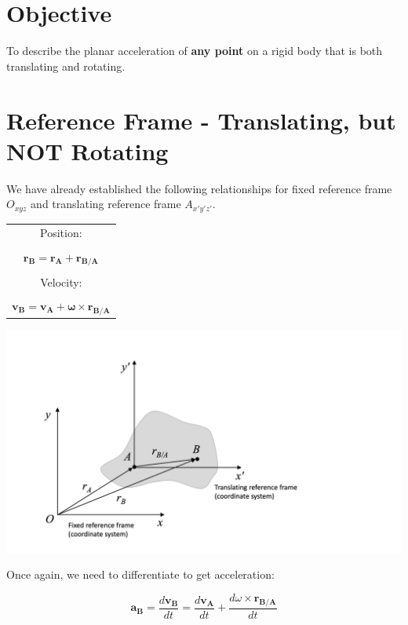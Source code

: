 \documentclass[12pt,letterpaper,twoside]{report}
\begin{document}
\section{Objective}
To describe the planar acceleration of \textbf{any point} on a rigid body that is both translating and rotating.  

\section{Reference Frame - Translating, but NOT Rotating}
We have already established the following relationships for fixed reference frame $O_{xyz}$ and translating reference frame $A_{x'y'z'}$.  


\begin{minipage}[c]{0.3\textwidth}
\begin{tabular}{  c  }
Position:  \\
  \\
$\bm{r_B} = \bm{r_A} +  \bm{r_{B/A}}$ \\
 \\
Velocity:  \\
 \\
$\bm{v_B} = \bm{v_A} + \bm{\omega} \times \bm{r_{B/A}}$ \\
\end{tabular}
\label{tab:singlebest}
\end{minipage}%
\begin{minipage}[c]{0.8\textwidth}
\includegraphics[trim={0cm 1cm 6cm 2cm},clip,width=1\textwidth, center]{Slide5} 
\end{minipage}

Once again, we need to differentiate to get acceleration:

\[
\bm{a_B} = \frac{d \bm{v_B}}{dt} = \frac{d \bm{v_A}}{dt} + \frac{d \omega \times \bm{r_{B/A}}}{dt} \]
\end{document}
